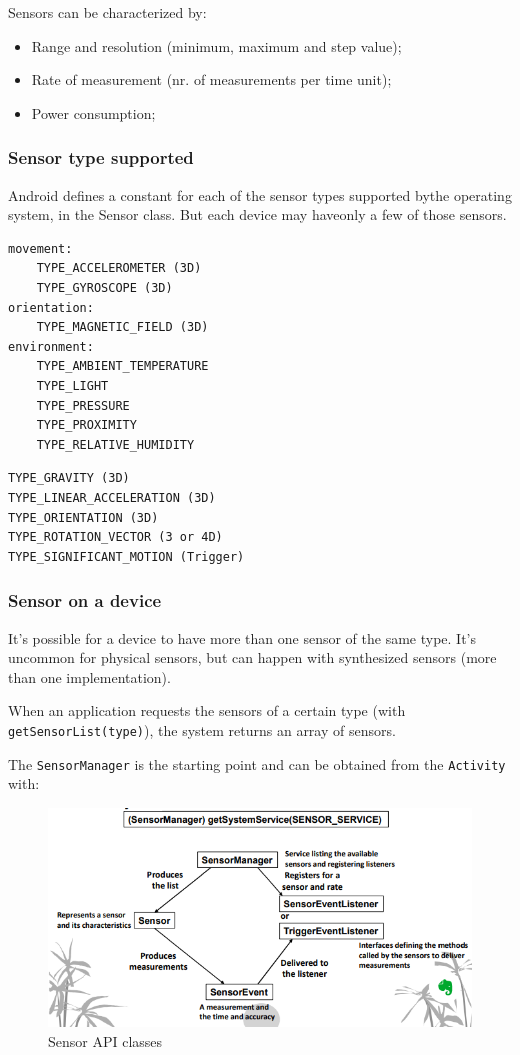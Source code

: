 Sensors can be characterized by:
\begin{itemize}
    \item Range and resolution (minimum, maximum and step value);
    \item Rate of measurement (nr. of measurements per time unit);
    \item Power consumption;
\end{itemize}

\subsubsection{Sensor type supported}

Android defines a constant for each of the 
sensor types supported bythe operating system, in the Sensor class. 
But each device may haveonly a few of those sensors.

\begin{lstlisting}[title=physical types]
movement:
    TYPE_ACCELEROMETER (3D)
    TYPE_GYROSCOPE (3D)
orientation:
    TYPE_MAGNETIC_FIELD (3D)
environment:
    TYPE_AMBIENT_TEMPERATURE
    TYPE_LIGHT
    TYPE_PRESSURE
    TYPE_PROXIMITY
    TYPE_RELATIVE_HUMIDITY
\end{lstlisting} 

\begin{lstlisting}[title=synthetized types]
TYPE_GRAVITY (3D)
TYPE_LINEAR_ACCELERATION (3D)
TYPE_ORIENTATION (3D)
TYPE_ROTATION_VECTOR (3 or 4D)
TYPE_SIGNIFICANT_MOTION (Trigger)
\end{lstlisting}

\subsubsection{Sensor on a device}
It's possible for a device to have more than one sensor of the same type.
It's uncommon for physical sensors, but can happen with synthesized
sensors (more than one implementation). 

When an application requests the sensors
of a certain type (with \texttt{getSensorList(type)}),
the system returns an array of sensors. 


The \texttt{SensorManager} is the starting point and can be obtained from
the \texttt{Activity} with:

\begin{figure}[h]
\centering
\includegraphics[width=0.8\linewidth]{figures/07_sensor_api_classes.png}
\caption{Sensor API classes}
\label{fig:sensor_api_classes}
\end{figure}

